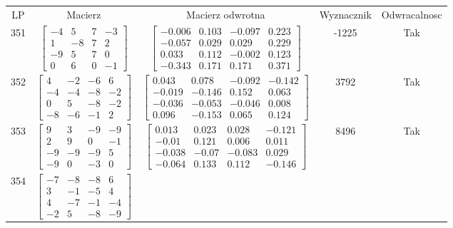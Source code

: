 \documentclass[a4paper,12pt]{article}
\begin{document}
\bgroup {} \vspace{0.2in} \begin{tabular}{c c c c c}
LP & Macierz & Macierz odwrotna & Wyznacznik & Odwracalnosc\\
351
&
$\begin{bmatrix} -4 & 5 & 7 & -3 \\ 1 & -8 & 7 & 2 \\ -9 & 5 & 7 & 0 \\ 0 & 6 & 0 & -1 \end{bmatrix}$
&
$\begin{bmatrix} -0.006 & 0.103 & -0.097 & 0.223 \\ -0.057 & 0.029 & 0.029 & 0.229 \\ 0.033 & 0.112 & -0.002 & 0.123 \\ -0.343 & 0.171 & 0.171 & 0.371 \end{bmatrix}$
&
-1225
&
Tak
\\
352
&
$\begin{bmatrix} 4 & -2 & -6 & 6 \\ -4 & -4 & -8 & -2 \\ 0 & 5 & -8 & -2 \\ -8 & -6 & -1 & 2 \end{bmatrix}$
&
$\begin{bmatrix} 0.043 & 0.078 & -0.092 & -0.142 \\ -0.019 & -0.146 & 0.152 & 0.063 \\ -0.036 & -0.053 & -0.046 & 0.008 \\ 0.096 & -0.153 & 0.065 & 0.124 \end{bmatrix}$
&
3792
&
Tak
\\
353
&
$\begin{bmatrix} 9 & 3 & -9 & -9 \\ 2 & 9 & 0 & -1 \\ -9 & -9 & -9 & 5 \\ -9 & 0 & -3 & 0 \end{bmatrix}$
&
$\begin{bmatrix} 0.013 & 0.023 & 0.028 & -0.121 \\ -0.01 & 0.121 & 0.006 & 0.011 \\ -0.038 & -0.07 & -0.083 & 0.029 \\ -0.064 & 0.133 & 0.112 & -0.146 \end{bmatrix}$
&
8496
&
Tak
\\
354
&
$\begin{bmatrix} -7 & -8 & -8 & 6 \\ 3 & -1 & -5 & 4 \\ 4 & -7 & -1 & -4 \\ -2 & 5 & -8 & -9 \end{bmatrix}$

\end{tabular}
\end{document}
